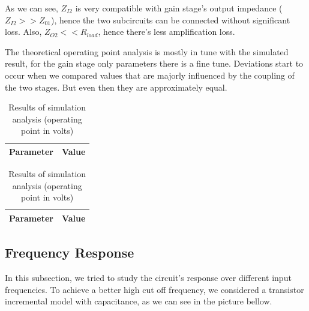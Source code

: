 As we can see, $Z_{I2}$ is very compatible with gain stage's output impedance ($Z_{I2}>>Z_{01}$), hence the two subcircuits can be connected without significant loss. Also, $Z_{O2}<<R_{load}$, hence there's less amplification loss.


The theoretical operating point analysis is mostly in tune with the simulated result, for the gain stage only parameters there is a fine tune. Deviations start to occur when we compared values that are majorly influenced by the coupling of the two stages. But even then they are approximately equal.

\begin{table}[!htb]
  \begin{minipage}{.5\linewidth}
     \centering
  \begin{tabular}{|c|c|}
    \hline    
    {\bf Parameter} & {\bf Value} \\ \hline
    
 \end{tabular}
 \caption{Results of theoretical analysis (operating point in volts)}
 \label{tab:merit}
  \end{minipage}%
    \hspace{2 mm}
    \begin{minipage}{.5\linewidth}
      \centering
        \begin{tabular}{|c|c|}
    \hline    
    {\bf Parameter} & {\bf Value} \\ \hline
    
 \end{tabular}
        \caption{Results of simulation analysis (operating point in volts)}
        \label{compmerit}
    \end{minipage} 
\end{table}

\subsection{Frequency Response}
 In this subsection, we tried to study the circuit's response over different input frequencies. To achieve a better high cut off frequency, we considered a transistor incremental model with capacitance, as we can see in the picture bellow.
 
